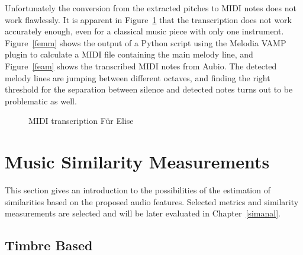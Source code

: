 \noindent Unfortunately the conversion from the extracted pitches to MIDI notes does not work flawlessly. It is apparent in Figure~\ref{fig:transc} that the transcription does not work accurately enough, even for a classical music piece with only one instrument. Figure~\ref{femm} shows the output of a Python script using the Melodia VAMP plugin to calculate a MIDI file containing the main melody line, and Figure~\ref{feam} shows the transcribed MIDI notes from Aubio. The detected melody lines are jumping between different octaves, and finding the right threshold for the separation between silence and detected notes turns out to be problematic as well.

\begin{figure}[htbp]
	\centering
	\caption{MIDI transcription Für Elise}
	\label{fig:transc}
\end{figure}
\FloatBarrier 

\section{Music Similarity Measurements}

This section gives an introduction to the possibilities of the estimation of similarities based on the proposed audio features. Selected metrics and similarity measurements are selected and will be later evaluated in Chapter~\ref{simanal}.

\subsection{Timbre Based}

